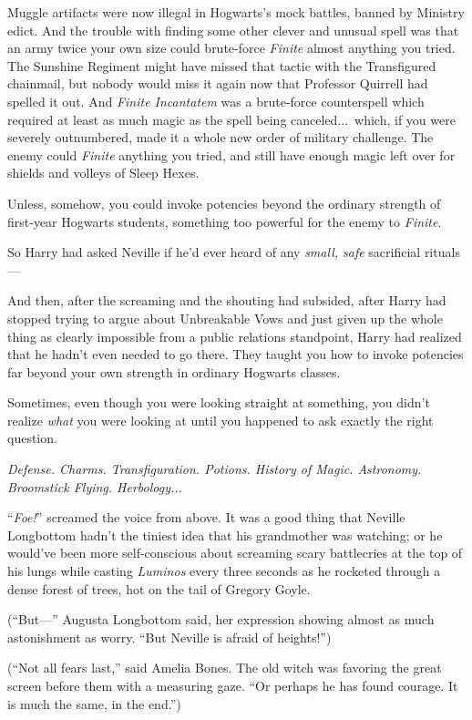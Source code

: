 Muggle artifacts were now illegal in Hogwarts’s mock battles,
banned by Ministry edict. And the trouble with finding some other
clever and unusual spell was that an army twice your own size could
brute-force \emph{Finite} almost anything you tried. The Sunshine
Regiment might have missed that tactic with the Transfigured
chainmail, but nobody would miss it again now that Professor
Quirrell had spelled it out. And \emph{Finite Incantatem} was a
brute-force counterspell which required at least as much magic as
the spell being canceled...\ which, if you were severely
outnumbered, made it a whole new order of military challenge. The
enemy could \emph{Finite} anything you tried, and still have enough
magic left over for shields and volleys of Sleep Hexes.

Unless, somehow, you could invoke potencies beyond the ordinary
strength of first-year Hogwarts students, something too powerful
for the enemy to \emph{Finite}.

So Harry had asked Neville if he’d ever heard of any \emph{small,
safe} sacrificial rituals—

And then, after the screaming and the shouting had subsided,
after Harry had stopped trying to argue about Unbreakable Vows and
just given up the whole thing as clearly impossible from a public
relations standpoint, Harry had realized that he hadn’t even needed
to go there. They taught you how to invoke potencies far beyond
your own strength in ordinary Hogwarts classes.

Sometimes, even though you were looking straight at something,
you didn’t realize \emph{what} you were looking at until you
happened to ask exactly the right question.

\emph{Defense. Charms. Transfiguration. Potions. History of Magic.
Astronomy. Broomstick Flying. Herbology...}

“\emph{Foe!}” screamed the voice from above.
\sbreak
It was a good thing that Neville Longbottom hadn’t the tiniest
idea that his grandmother was watching; or he would’ve been more
self-conscious about screaming scary battlecries at the top of his
lungs while casting \emph{Luminos} every three seconds as he
rocketed through a dense forest of trees, hot on the tail of
Gregory Goyle.

(“But—” Augusta Longbottom said, her expression showing almost
as much astonishment as worry. “But Neville is afraid of
heights!”)

(“Not all fears last,” said Amelia Bones. The old witch was
favoring the great screen before them with a measuring gaze. “Or
perhaps he has found courage. It is much the same, in the
end.”)

